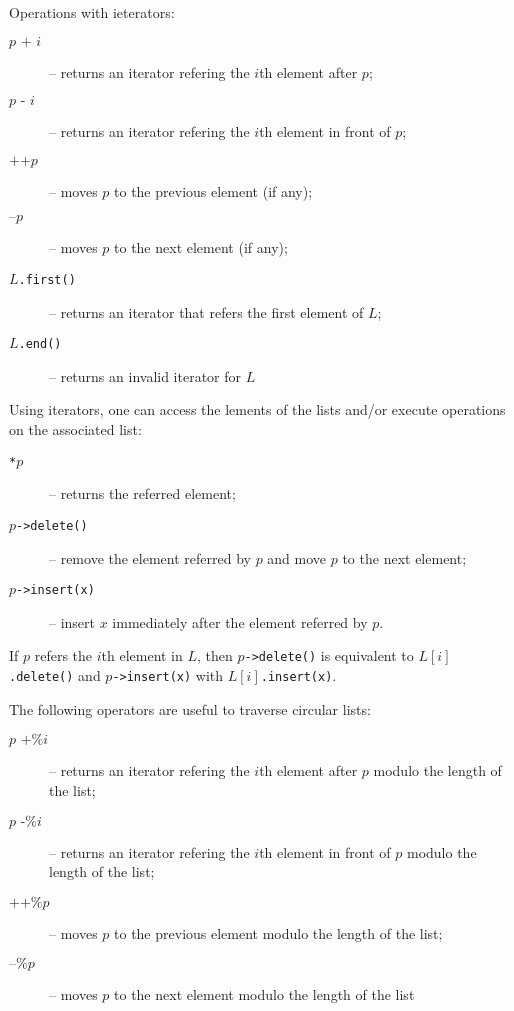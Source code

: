 \documentclass[a4paper]{report}
\begin{document}
Operations with ieterators:
\begin{description}
\item[$p\texttt{ + }i$] -- returns an iterator refering the $i$th element after $p$;
\item[$p\texttt{ - }i$] -- returns an iterator refering the $i$th element in front of $p$;
\item[$\texttt{++}p$] -- moves $p$ to the previous element (if any);
\item[$\texttt{--}p$]  -- moves $p$ to the next element (if any);
\item[$L$\texttt{.first()}] -- returns an iterator that refers the first element of $L$;
\item[$L$\texttt{.end()}] -- returns an invalid iterator for $L$
\end{description}

Using iterators, one can access the lements of the lists and/or execute operations on the associated list:
\begin{description}
\item[\texttt{*}$p$]  -- returns the referred element;
\item[$p$\texttt{->delete()}] -- remove the element referred by $p$ and move $p$ to the next element;
\item[$p$\texttt{->insert(x)}] -- insert $x$ immediately after the element referred by $p$.
\end{description}

If $p$ refers the $i$th element in $L$, then $p$\texttt{->delete()} is equivalent to $L[i]$\texttt{.delete()} and $p$\texttt{->insert(x)} with $L[i]$\texttt{.insert(x)}.


The following operators are useful to traverse circular lists:
\begin{description}
\item[$p\texttt{ +\% }i$] -- returns an iterator refering the $i$th element after $p$ modulo the length of the list;
\item[$p\texttt{ -\% }i$] -- returns an iterator refering the $i$th element in front of $p$ modulo the length of the list;
\item[$\texttt{++\%}p$] -- moves $p$ to the previous element modulo the length of the list;
\item[$\texttt{--\%}p$] -- moves $p$ to the next element modulo the length of the list
\end{description}
\end{document}
